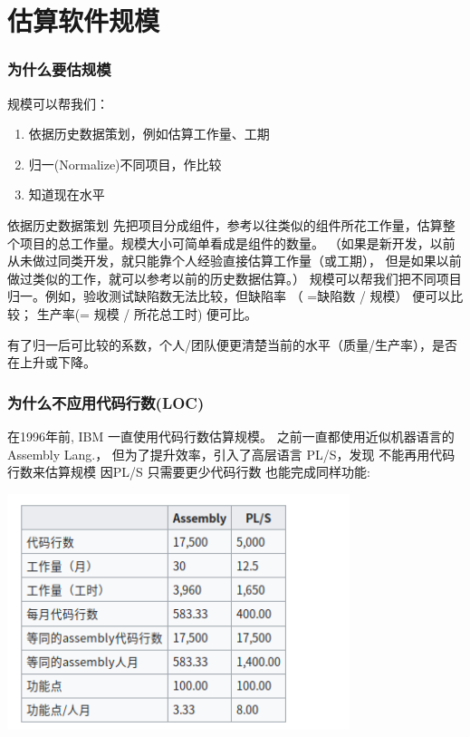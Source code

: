 \chapter{估算软件规模} %


\hypertarget{ux4e3aux4ec0ux4e48ux8981ux4f30ux89c4ux6a21}{%
\subsection{为什么要估规模}\label{ux4e3aux4ec0ux4e48ux8981ux4f30ux89c4ux6a21}}

规模可以帮我们：

\begin{enumerate}
\tightlist
\item
  依据历史数据策划，例如估算工作量、工期
\item
  归一(Normalize)不同项目，作比较
\item
  知道现在水平
\end{enumerate}

依据历史数据策划 先把项目分成组件，参考以往类似的组件所花工作量，估算整个项目的总工作量。规模大小可简单看成是组件的数量。 （如果是新开发，以前从未做过同类开发，就只能靠个人经验直接估算工作量（或工期）， 但是如果以前做过类似的工作，就可以参考以前的历史数据估算。） 
规模可以帮我们把不同项目归一。例如，验收测试缺陷数无法比较，但缺陷率 （
=缺陷数 / 规模） 便可以比较； 生产率(= 规模 / 所花总工时) 便可比。

有了归一后可比较的系数，个人/团队便更清楚当前的水平（质量/生产率），是否在上升或下降。

\hypertarget{ux4e3aux4ec0ux4e48ux4e0dux5e94ux7528ux4ee3ux7801ux884cux6570loc}{%
\subsection{为什么不应用代码行数(LOC)}\label{ux4e3aux4ec0ux4e48ux4e0dux5e94ux7528ux4ee3ux7801ux884cux6570loc}}

在1996年前, IBM 一直使用代码行数估算规模。
之前一直都使用近似机器语言的Assembly Lang.，
但为了提升效率，引入了高层语言 PL/S，发现 不能再用代码行数来估算规模
因PL/S 只需要更少代码行数 也能完成同样功能:


\includegraphics[width=10cm]{Screenshotfrom20221220202712.png}


